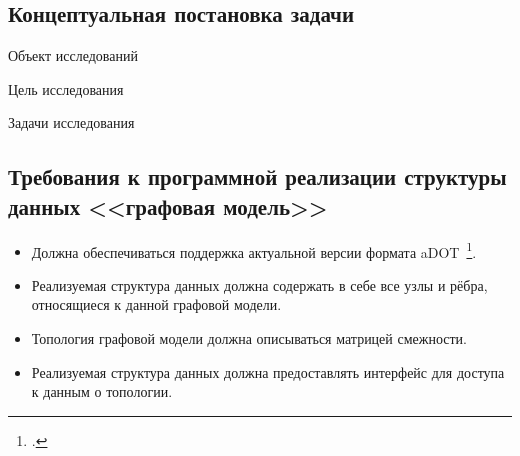 \subsection{Концептуальная постановка задачи}
\begin{frame}%

\begin{block}{Объект исследований}
\textexample{\ObjectOfResearch}
\end{block}

\begin{block}{Цель исследования}
\textexample{\GoalOfResearch}
\end{block}

\begin{block}{Задачи исследования}
\begin{enumerate}
\end{enumerate}
\end{block}

\end{frame}

\subsection{Требования к программной реализации структуры данных <<графовая модель>>}
\begin{frame}%

\begin{itemize}
	\item Должна обеспечиваться поддержка актуальной версии формата aDOT~\footcite{SokADOT}.
	\item Реализуемая структура данных должна содержать в себе все узлы и рёбра, относящиеся к данной графовой модели.
	\item Топология графовой модели должна описываться матрицей смежности.
	\item Реализуемая структура данных должна предоставлять интерфейс для доступа к данным о топологии.
\end{itemize}

\end{frame}

